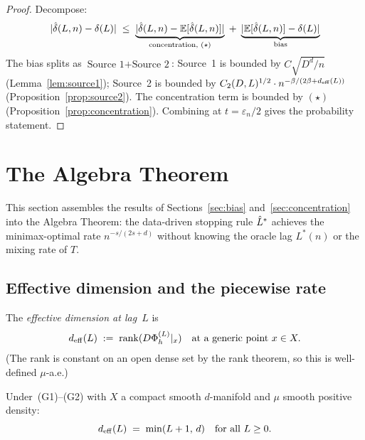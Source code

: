 \begin{proof}
Decompose:
\[
  |\hat{\delta}(L,n) - \delta(L)|
  \;\leq\;
  \underbrace{|\hat{\delta}(L,n) - \mathbb{E}[\hat{\delta}(L,n)]|}_{\text{concentration, }(\star)}
  \;+\;
  \underbrace{|\mathbb{E}[\hat{\delta}(L,n)] - \delta(L)|}_{\text{bias}}
\]
The bias splits as $\text{Source~1} + \text{Source~2}$:
Source~1 is bounded by $C\sqrt{D^d/n}$ (Lemma~\ref{lem:source1});
Source~2 is bounded by $C_2(D,L)^{1/2} \cdot n^{-\beta/(2\beta+d_{\mathrm{eff}}(L))}$
(Proposition~\ref{prop:source2}).
The concentration term is bounded by $(\star)$ (Proposition~\ref{prop:concentration}).
Combining at $t = \varepsilon_n/2$ gives the probability statement.
\end{proof}

\section{The Algebra Theorem}
\label{sec:algebra}

This section assembles the results of Sections~\ref{sec:bias}
and~\ref{sec:concentration} into the Algebra Theorem: the data-driven stopping
rule $\hat{L}^*$ achieves the minimax-optimal rate $n^{-s/(2s+d)}$ without knowing
the oracle lag $L^*(n)$ or the mixing rate of $T$.

\subsection{Effective dimension and the piecewise rate}

\begin{definition}
\label{def:deff}
The \emph{effective dimension at lag~$L$} is
\[
  d_{\mathrm{eff}}(L) \;:=\; \operatorname{rank}(D\Phi_h^{(L)}|_x)
  \quad\text{at a generic point } x \in X.
\]
(The rank is constant on an open dense set by the rank theorem, so this is
well-defined $\mu$-a.e.)
\end{definition}

\begin{lemma}
\label{lem:dimeff}
Under~(G1)--(G2) with $X$ a compact smooth $d$-manifold and $\mu$ smooth
positive density:
\[
  d_{\mathrm{eff}}(L) \;=\; \min(L+1,\, d) \quad \text{for all } L \geq 0.
\]
\end{lemma}

